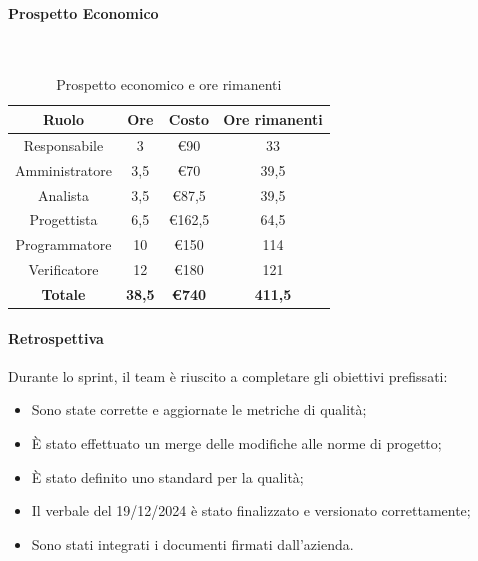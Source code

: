 \documentclass{article}
\begin{document}
                \paragraph{Prospetto Economico}\mbox{}\\
                \begin{table}[H]
                    \centering
                    \begin{tabular}{|c|c|c|c|}
                    \hline
                    \textbf{Ruolo}  & \textbf{Ore}  & \textbf{Costo} & \textbf{Ore rimanenti} \\ \hline
                    Responsabile    & 3             & €90            & 33                     \\ \hline
                    Amministratore  & 3,5           & €70            & 39,5                   \\ \hline
                    Analista        & 3,5           & €87,5          & 39,5                   \\ \hline
                    Progettista     & 6,5           & €162,5         & 64,5                   \\ \hline
                    Programmatore   & 10            & €150           & 114                    \\ \hline
                    Verificatore    & 12            & €180           & 121                    \\ \hline
                    \textbf{Totale} & \textbf{38,5} & \textbf{\euro740}   & \textbf{411,5}         \\ \hline
                    \end{tabular}
                    \caption{Prospetto economico e ore rimanenti}
                \end{table}

                \paragraph{Retrospettiva}
                Durante lo sprint, il team è riuscito a completare gli obiettivi prefissati:
                \begin{itemize}
                    \item Sono state corrette e aggiornate le metriche di qualità;
                    \item È stato effettuato un merge delle modifiche alle norme di progetto;
                    \item È stato definito uno standard per la qualità;
                    \item Il verbale del 19/12/2024 è stato finalizzato e versionato correttamente;
                    \item Sono stati integrati i documenti firmati dall'azienda.
                \end{itemize}
                
\end{document}
